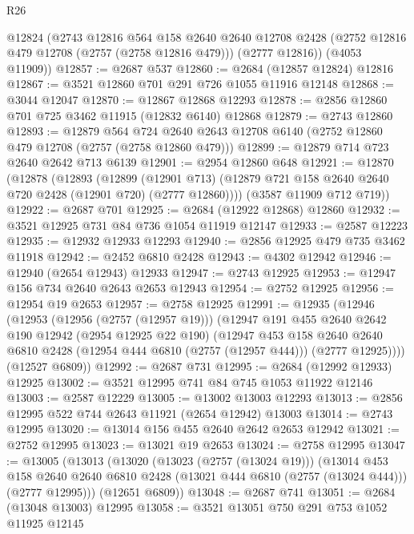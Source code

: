 \begin{lexlean}{R26}
\begin{coremodule}
      @12824
      (@2743
        @12816
        @564
        @158
        @2640
        @2640
        @12708
        @2428
        (@2752 @12816 @479 @12708 (@2757 (@2758 @12816 @479)))
        (@2777 @12816))
      (@4053 @11909))
@12857 := @2687 @537
@12860 := @2684 (@12857 @12824) @12816
@12867 := @3521 @12860 @701 @291 @726 @1055 @11916 @12148
@12868 := @3044 @12047
@12870 := @12867 @12868 @12293
@12878 := @2856 @12860 @701 @725 @3462 @11915 (@12832 @6140) @12868
@12879 := @2743 @12860
@12893 := @12879
    @564
    @724
    @2640
    @2643
    @12708
    @6140
    (@2752 @12860 @479 @12708 (@2757 (@2758 @12860 @479)))
@12899 := @12879 @714 @723 @2640 @2642 @713 @6139
@12901 := @2954 @12860 @648
@12921 := @12870
    (@12878
      (@12893
        (@12899
          (@12901 @713)
          (@12879 @721 @158 @2640 @2640 @720 @2428 (@12901 @720) (@2777 @12860))))
      (@3587 @11909 @712 @719))
@12922 := @2687 @701
@12925 := @2684 (@12922 @12868) @12860
@12932 := @3521 @12925 @731 @84 @736 @1054 @11919 @12147
@12933 := @2587 @12223
@12935 := @12932 @12933 @12293
@12940 := @2856 @12925 @479 @735 @3462 @11918
@12942 := @2452 @6810 @2428
@12943 := @4302 @12942
@12946 := @12940 (@2654 @12943) @12933
@12947 := @2743 @12925
@12953 := @12947 @156 @734 @2640 @2643 @2653 @12943
@12954 := @2752 @12925
@12956 := @12954 @19 @2653
@12957 := @2758 @12925
@12991 := @12935
    (@12946
      (@12953
        (@12956 (@2757 (@12957 @19)))
        (@12947
          @191
          @455
          @2640
          @2642
          @190
          @12942
          (@2954 @12925 @22 @190)
          (@12947
            @453
            @158
            @2640
            @2640
            @6810
            @2428
            (@12954 @444 @6810 (@2757 (@12957 @444)))
            (@2777 @12925))))
      (@12527 @6809))
@12992 := @2687 @731
@12995 := @2684 (@12992 @12933) @12925
@13002 := @3521 @12995 @741 @84 @745 @1053 @11922 @12146
@13003 := @2587 @12229
@13005 := @13002 @13003 @12293
@13013 := @2856 @12995 @522 @744 @2643 @11921 (@2654 @12942) @13003
@13014 := @2743 @12995
@13020 := @13014 @156 @455 @2640 @2642 @2653 @12942
@13021 := @2752 @12995
@13023 := @13021 @19 @2653
@13024 := @2758 @12995
@13047 := @13005
    (@13013
      (@13020
        (@13023 (@2757 (@13024 @19)))
        (@13014
          @453
          @158
          @2640
          @2640
          @6810
          @2428
          (@13021 @444 @6810 (@2757 (@13024 @444)))
          (@2777 @12995)))
      (@12651 @6809))
@13048 := @2687 @741
@13051 := @2684 (@13048 @13003) @12995
@13058 := @3521 @13051 @750 @291 @753 @1052 @11925 @12145

\end{coremodule}
\end{lexlean}
